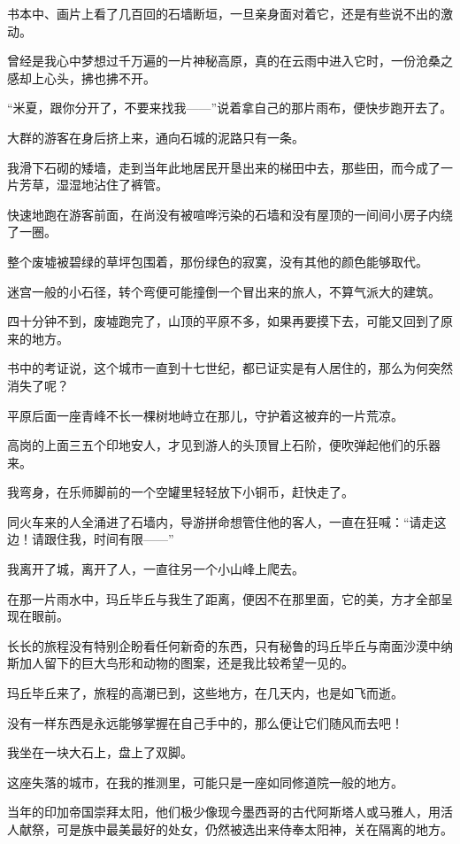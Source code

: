 \par 书本中、画片上看了几百回的石墙断垣，一旦亲身面对着它，还是有些说不出的激动。
\par 曾经是我心中梦想过千万遍的一片神秘高原，真的在云雨中进入它时，一份沧桑之感却上心头，拂也拂不开。
\par “米夏，跟你分开了，不要来找我——”说着拿自己的那片雨布，便快步跑开去了。
\par 大群的游客在身后挤上来，通向石城的泥路只有一条。
\par 我滑下石砌的矮墙，走到当年此地居民开垦出来的梯田中去，那些田，而今成了一片芳草，湿湿地沾住了裤管。
\par 快速地跑在游客前面，在尚没有被喧哗污染的石墙和没有屋顶的一间间小房子内绕了一圈。
\par 整个废墟被碧绿的草坪包围着，那份绿色的寂寞，没有其他的颜色能够取代。
\par 迷宫一般的小石径，转个弯便可能撞倒一个冒出来的旅人，不算气派大的建筑。
\par 四十分钟不到，废墟跑完了，山顶的平原不多，如果再要摸下去，可能又回到了原来的地方。
\par 书中的考证说，这个城市一直到十七世纪，都已证实是有人居住的，那么为何突然消失了呢？
\par 平原后面一座青峰不长一棵树地峙立在那儿，守护着这被弃的一片荒凉。
\par 高岗的上面三五个印地安人，才见到游人的头顶冒上石阶，便吹弹起他们的乐器来。
\par 我弯身，在乐师脚前的一个空罐里轻轻放下小铜币，赶快走了。
\par 同火车来的人全涌进了石墙内，导游拼命想管住他的客人，一直在狂喊：“请走这边！请跟住我，时间有限——”
\par 我离开了城，离开了人，一直往另一个小山峰上爬去。
\par 在那一片雨水中，玛丘毕丘与我生了距离，便因不在那里面，它的美，方才全部呈现在眼前。
\par 长长的旅程没有特别企盼看任何新奇的东西，只有秘鲁的玛丘毕丘与南面沙漠中纳斯加人留下的巨大鸟形和动物的图案，还是我比较希望一见的。
\par 玛丘毕丘来了，旅程的高潮已到，这些地方，在几天内，也是如飞而逝。
\par 没有一样东西是永远能够掌握在自己手中的，那么便让它们随风而去吧！
\par 我坐在一块大石上，盘上了双脚。
\par 这座失落的城市，在我的推测里，可能只是一座如同修道院一般的地方。
\par 当年的印加帝国崇拜太阳，他们极少像现今墨西哥的古代阿斯塔人或马雅人，用活人献祭，可是族中最美最好的处女，仍然被选出来侍奉太阳神，关在隔离的地方。
